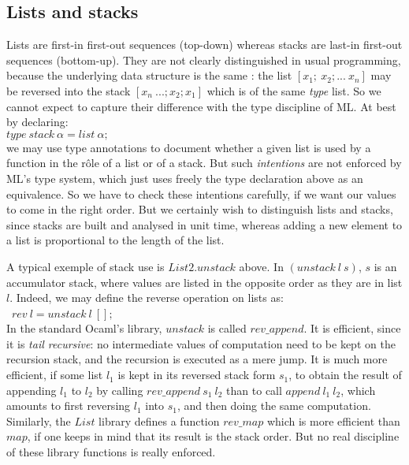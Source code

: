 \subsection{Lists and stacks}

Lists are first-in first-out sequences (top-down) whereas stacks
are last-in first-out sequences (bottom-up). They are not clearly
distinguished in usual programming, because the underlying data structure
is the same : the list $[x_1;~x_2; ...~x_n]$ may be reversed into
the stack $[x_n~...; x_2; x_1]$ which is of the same {\sl type} list. So
we cannot expect to capture their difference with the type discipline of ML.
At best by declaring:\\
$type~stack~\alpha = list~\alpha;$\\
we may use type annotations to document whether a given list is used by
a function in the r\^ole of a list or of a stack. But such {\sl intentions}
are not enforced by ML's type system, which just uses freely the type
declaration above as an equivalence. So we have to check
these intentions carefully, if we want our values to come in the right
order. But we certainly wish to distinguish lists and stacks, since stacks
are built and analysed in unit time, whereas adding a new element to a list
is proportional to the length of the list. 

A typical exemple of stack use is $List2.unstack$ above. 
In $(unstack~l~s)$, $s$ is an accumulator stack, where values are listed
in the opposite order as they are in list $l$. Indeed, we may define
the reverse operation on lists as:\\
~$rev~l = unstack~l~[];$\\

In the standard Ocaml's library, $unstack$ is called $rev\_append$.
It is efficient, since it is {\sl tail recursive}: no intermediate values 
of computation need to be kept on the recursion stack, and the recursion
is executed as a mere jump. It is much more efficient, if some list $l_1$
is kept in its reversed stack form $s_1$, to obtain the result of 
appending $l_1$ to $l_2$ by calling $rev\_append~s_1~l_2$ 
than to call $append~l_1~l_2$,
which amounts to first reversing $l_1$ into $s_1$, 
and then doing the same computation.
Similarly, the $List$ library defines a function $rev\_map$ which is
more efficient than $map$, if one keeps in mind that its result 
is the stack order.
But no real discipline of these library functions is really enforced.

